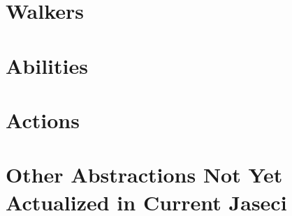\section{Walkers}
\section{Abilities}
\section{Actions}
\section{Other Abstractions Not Yet Actualized in Current Jaseci}
